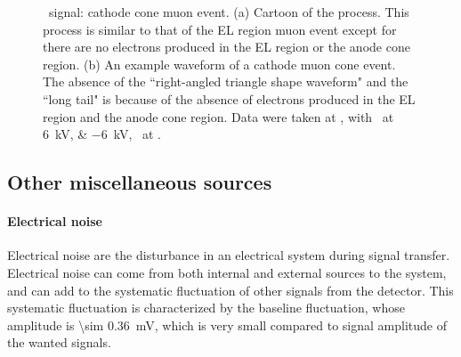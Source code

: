 \begin{figure}[!htbp]
\begin{subfigure}[b]{0.7\textwidth}
		\caption{}
		\label{fig:cathode muon b}
	\end{subfigure}
	\caption[\gtest\ signal: cathode cone muon event.]{\gtest\ signal: cathode cone muon event. (a) Cartoon of the process. This process is similar to that of the EL region muon event except for there are no electrons produced in the EL region or the anode cone region. (b) An example waveform of a cathode muon cone event. The absence of the ``right-angled triangle shape waveform" and the ``long tail"  is because of the absence of electrons produced in the EL region and the anode cone region.  Data were taken at , with \opvtvb\ at \SIlist{+6;-6}{kV}, \opgd\ at \standarddensity .%
	}
	\label{fig:cathode muon}
\end{figure}

\subsection{Other miscellaneous sources}

\paragraph{Electrical noise} 
\label{sec:events noise}
Electrical noise are the disturbance in an electrical system during signal transfer. Electrical noise can come from both internal and external sources to the system, and can add to the systematic fluctuation of other signals from the \gtest detector. This systematic fluctuation is characterized by the baseline fluctuation, whose amplitude is \SI{\sim 0.36}{\mV}, which is very small compared to signal amplitude of the wanted signals. 

